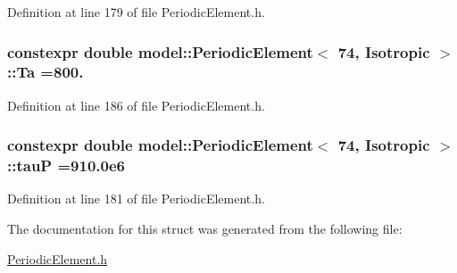 Definition at line 179 of file Periodic\+Element.\+h.

\hypertarget{structmodel_1_1_periodic_element_3_0174_00_01_isotropic_01_4_a1c0ebb3100520345585f2cd559bec2c3}{}
\subsubsection[{Ta}]{\setlength{\rightskip}{0pt plus 5cm}constexpr double {\bf model\+::\+Periodic\+Element}$<$ 74, {\bf Isotropic} $>$\+::Ta =800.\hspace{0.3cm}{\ttfamily [static]}}\label{structmodel_1_1_periodic_element_3_0174_00_01_isotropic_01_4_a1c0ebb3100520345585f2cd559bec2c3}


Definition at line 186 of file Periodic\+Element.\+h.

\hypertarget{structmodel_1_1_periodic_element_3_0174_00_01_isotropic_01_4_a8386552f04cc3ba4eedf99be04e411cb}{}
\subsubsection[{tau\+P}]{\setlength{\rightskip}{0pt plus 5cm}constexpr double {\bf model\+::\+Periodic\+Element}$<$ 74, {\bf Isotropic} $>$\+::tau\+P =910.\+0e6\hspace{0.3cm}{\ttfamily [static]}}\label{structmodel_1_1_periodic_element_3_0174_00_01_isotropic_01_4_a8386552f04cc3ba4eedf99be04e411cb}


Definition at line 181 of file Periodic\+Element.\+h.



The documentation for this struct was generated from the following file\+:\begin{DoxyCompactItemize}
\item 
\hyperlink{_periodic_element_8h}{Periodic\+Element.\+h}\end{DoxyCompactItemize}
